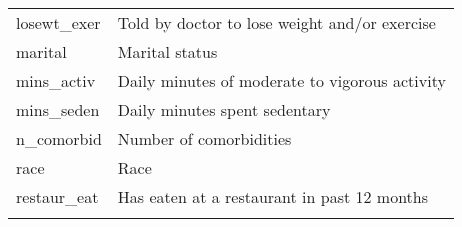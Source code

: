 \documentclass[]{article}
\begin{document}
\begin{longtable}[]{@{}ll@{}}
\begin{minipage}[t]{0.24\columnwidth}\raggedright
losewt\_exer\strut
\end{minipage} & \begin{minipage}[t]{0.70\columnwidth}\raggedright
Told by doctor to lose weight and/or exercise\strut
\end{minipage}\tabularnewline
\begin{minipage}[t]{0.24\columnwidth}\raggedright
marital\strut
\end{minipage} & \begin{minipage}[t]{0.70\columnwidth}\raggedright
Marital status\strut
\end{minipage}\tabularnewline
\begin{minipage}[t]{0.24\columnwidth}\raggedright
mins\_activ\strut
\end{minipage} & \begin{minipage}[t]{0.70\columnwidth}\raggedright
Daily minutes of moderate to vigorous activity\strut
\end{minipage}\tabularnewline
\begin{minipage}[t]{0.24\columnwidth}\raggedright
mins\_seden\strut
\end{minipage} & \begin{minipage}[t]{0.70\columnwidth}\raggedright
Daily minutes spent sedentary\strut
\end{minipage}\tabularnewline
\begin{minipage}[t]{0.24\columnwidth}\raggedright
n\_comorbid\strut
\end{minipage} & \begin{minipage}[t]{0.70\columnwidth}\raggedright
Number of comorbidities\strut
\end{minipage}\tabularnewline
\begin{minipage}[t]{0.24\columnwidth}\raggedright
race\strut
\end{minipage} & \begin{minipage}[t]{0.70\columnwidth}\raggedright
Race\strut
\end{minipage}\tabularnewline
\begin{minipage}[t]{0.24\columnwidth}\raggedright
restaur\_eat\strut
\end{minipage} & \begin{minipage}[t]{0.70\columnwidth}\raggedright
Has eaten at a restaurant in past 12 months\strut
\end{minipage}\tabularnewline
\begin{minipage}[t]{0.24\columnwidth}\raggedright

\end{minipage}
\end{longtable}
\end{document}
